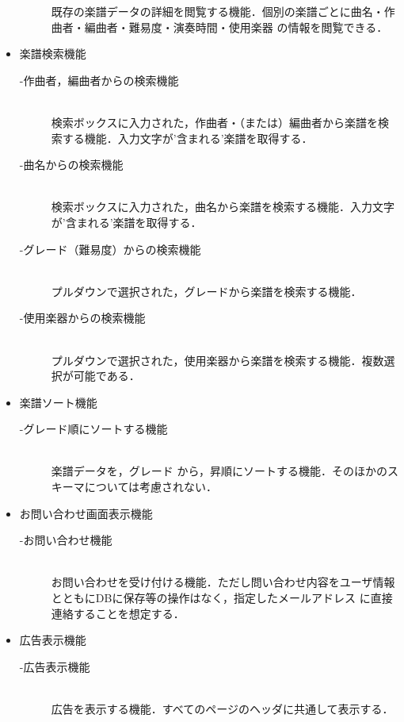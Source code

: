 \begin{itemize}
\begin{description}
			      既存の楽譜データの詳細を閲覧する機能．個別の楽譜ごとに曲名・作曲者・編曲者・難易度・演奏時間・使用楽器
			      の情報を閲覧できる．
	      \end{description}
	\item 楽譜検索機能
	      \begin{description}
		      \item[-作曲者，編曲者からの検索機能]\mbox{}\\
		      検索ボックスに入力された，作曲者・（または）編曲者から楽譜を検索する機能．入力文字が'含まれる'楽譜を取得する．
		      \item[-曲名からの検索機能] \mbox{}\\
			      検索ボックスに入力された，曲名から楽譜を検索する機能．入力文字が'含まれる'楽譜を取得する．
		      \item[-グレード（難易度）からの検索機能] \mbox{}\\
			      プルダウンで選択された，グレードから楽譜を検索する機能．
		      \item[-使用楽器からの検索機能] \mbox{}\\
			      プルダウンで選択された，使用楽器から楽譜を検索する機能．複数選択が可能である．
	      \end{description}
	\item 楽譜ソート機能
	      \begin{description}
		      \item[-グレード順にソートする機能] \mbox{}\\
			      楽譜データを，グレード
			      から，昇順にソートする機能．そのほかのスキーマについては考慮されない．
	      \end{description}
	\item お問い合わせ画面表示機能
	      \begin{description}
		      \item[-お問い合わせ機能]\mbox{}\\
		      お問い合わせを受け付ける機能．ただし問い合わせ内容をユーザ情報とともにDBに保存等の操作はなく，指定したメールアドレス
		      に直接連絡することを想定する．
	      \end{description}
	\item 広告表示機能
	      \begin{description}
		      \item[-広告表示機能]\mbox{}\\
		      広告を表示する機能．すべてのページのヘッダに共通して表示する．
	      \end{description}
\end{itemize}

